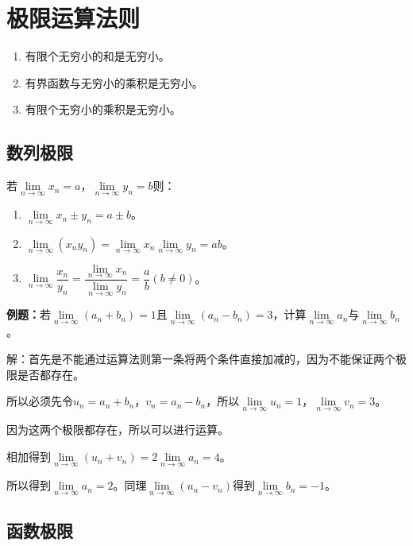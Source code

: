 \documentclass[UTF8, 12pt]{ctexart}
\begin{document}
        \section{极限运算法则}

        \begin{enumerate}
            \item 有限个无穷小的和是无穷小。
            \item 有界函数与无穷小的乘积是无穷小。
            \item 有限个无穷小的乘积是无穷小。
        \end{enumerate}

        \subsection{数列极限}

        若$\lim\limits_{n\to\infty}x_n=a$，$\lim\limits_{n\to\infty}y_n=b$则：

        \begin{enumerate}
            \item $\lim\limits_{n\to\infty}x_n\pm y_n=a\pm b$。
            \item $\lim\limits_{n\to\infty}(x_ny_n)=\lim\limits_{n\to\infty}x_n\lim\limits_{n\to\infty}y_n=ab$。
            \item $\lim\limits_{n\to\infty}\dfrac{x_n}{y_n}=\dfrac{\lim\limits_{n\to\infty}x_n}{\lim\limits_{n\to\infty}y_n}=\dfrac{a}{b}(b\neq 0)$。
        \end{enumerate}

        \textbf{例题：}若$\lim\limits_{n\to\infty}(a_n+b_n)=1$且$\lim\limits_{n\to\infty}(a_n-b_n)=3$，计算$\lim\limits_{n\to\infty}a_n$与$\lim\limits_{n\to\infty}b_n$。

        解：首先是不能通过运算法则第一条将两个条件直接加减的，因为不能保证两个极限是否都存在。

        所以必须先令$u_n=a_n+b_n$，$v_n=a_n-b_n$，所以$\lim\limits_{n\to\infty}u_n=1$，$\lim\limits_{n\to\infty}v_n=3$。

        因为这两个极限都存在，所以可以进行运算。

        相加得到$\lim\limits_{n\to\infty}(u_n+v_n)=2\lim\limits_{n\to\infty}a_n=4$。

        所以得到$\lim\limits_{n\to\infty}a_n=2$。同理$\lim\limits_{n\to\infty}(u_n-v_n)$得到$\lim\limits_{n\to\infty}b_n=-1$。

        \subsection{函数极限}
\end{document}
